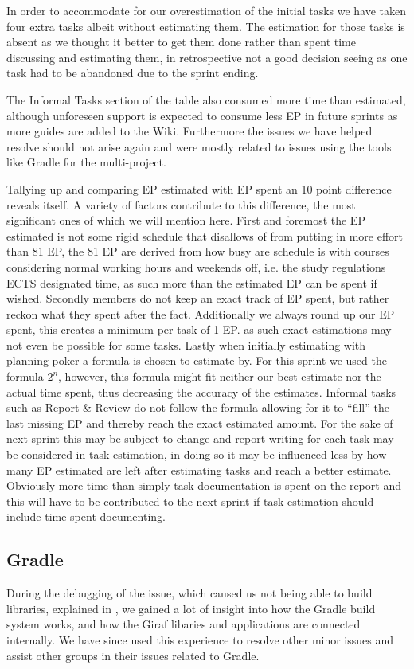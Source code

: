 In order to accommodate for our overestimation of the initial tasks we have taken four extra tasks albeit without estimating them.
The estimation for those tasks is absent as we thought it better to get them done rather than spent time discussing and estimating them, in retrospective not a good decision seeing as one task had to be abandoned due to the sprint ending.

The Informal Tasks section of the table also consumed more time than estimated, although unforeseen support is expected to consume less EP in future sprints as more guides are added to the Wiki.
Furthermore the issues we have helped resolve should not arise again and were mostly related to issues using the tools like Gradle for the multi-project.

Tallying up and comparing EP estimated with EP spent an 10 point difference reveals itself.
A variety of factors contribute to this difference, the most significant ones of which we will mention here.
First and foremost the EP estimated is not some rigid schedule that disallows of from putting in more effort than 81 EP, the 81 EP are derived from how busy are schedule is with courses considering normal working hours and weekends off, i.e. the study regulations ECTS designated time, as such more than the estimated EP can be spent if wished.
Secondly members do not keep an exact track of EP spent, but rather reckon what they spent after the fact.
Additionally  we always round up our EP spent, this creates a minimum per task of 1 EP.
as such exact estimations may not even be possible for some tasks. 
Lastly when initially estimating with planning poker a formula is chosen to estimate by. 
For this sprint we used the formula $2^n$, however, this formula might fit neither our best estimate nor the actual time spent, thus decreasing the accuracy of the estimates. 
Informal tasks such as Report \& Review do not follow the formula allowing for it to ``fill'' the last missing EP and thereby reach the exact estimated amount. 
For the sake of next sprint this may be subject to change and report writing for each task may be considered in task estimation, in doing so it may be influenced less by how many EP estimated are left after estimating tasks and reach a better estimate.
Obviously more time than simply task documentation is spent on the report and this will have to be contributed to the next sprint if task estimation should include time spent documenting.

\subsection{Gradle}
During the debugging of the issue, which caused us not being able to build libraries, explained in , we gained a lot of insight into how the Gradle build system works, and how the Giraf libaries and applications are connected internally. 
We have since used this experience to resolve other minor issues and assist other groups in their issues related to Gradle. 

